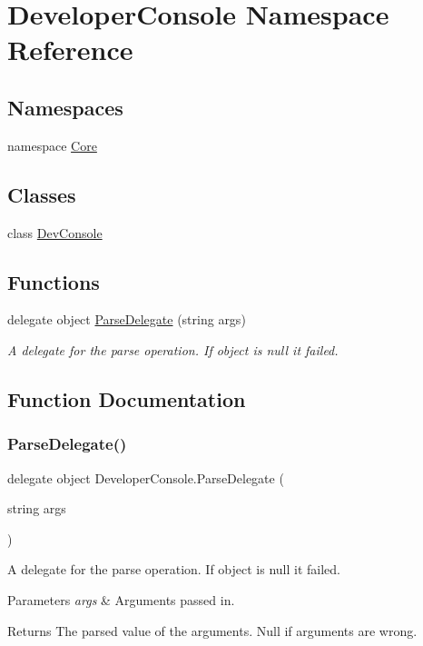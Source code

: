 \hypertarget{namespace_developer_console}{}\section{Developer\+Console Namespace Reference}
\label{namespace_developer_console}
\subsection*{Namespaces}
\begin{DoxyCompactItemize}
\item 
namespace \hyperlink{namespace_developer_console_1_1_core}{Core}
\end{DoxyCompactItemize}
\subsection*{Classes}
\begin{DoxyCompactItemize}
\item 
class \hyperlink{class_developer_console_1_1_dev_console}{Dev\+Console}
\end{DoxyCompactItemize}
\subsection*{Functions}
\begin{DoxyCompactItemize}
\item 
delegate object \hyperlink{namespace_developer_console_a62e10d7e4aeed7c6bcd4a780468c74fa}{Parse\+Delegate} (string args)
\begin{DoxyCompactList}\small\item\em A delegate for the parse operation. If object is null it failed. \end{DoxyCompactList}\end{DoxyCompactItemize}


\subsection{Function Documentation}
\mbox{\label{namespace_developer_console_a62e10d7e4aeed7c6bcd4a780468c74fa}} 
\subsubsection{\texorpdfstring{Parse\+Delegate()}{ParseDelegate()}}
{\footnotesize\ttfamily delegate object Developer\+Console.\+Parse\+Delegate (\begin{DoxyParamCaption}\item[{string}]{args }\end{DoxyParamCaption})}



A delegate for the parse operation. If object is null it failed. 


\begin{DoxyParams}{Parameters}
{\em args} & Arguments passed in. \\
\hline
\end{DoxyParams}
\begin{DoxyReturn}{Returns}
The parsed value of the arguments. Null if arguments are wrong. 
\end{DoxyReturn}

